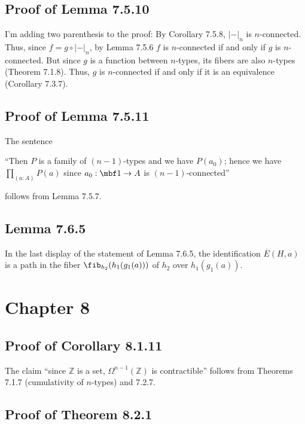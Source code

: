\documentclass[12pt]{article}
\begin{document}

\subsection{Proof of Lemma 7.5.10}

I'm adding two parenthesis to the proof: By Corollary 7.5.8, $|-|_n$ is $n$-connected. Thus, since $f=g\circ |-|_n$, by Lemma 7.5.6 $f$ is $n$-connected if and only if $g$ is $n$-connected. But since $g$ is a function between $n$-types, its fibers are also $n$-types (Theorem 7.1.8). Thus, $g$ is $n$-connected if and only if it is an equivalence (Corollary 7.3.7).


\subsection{Proof of Lemma 7.5.11}

The sentence 

\nn``Then $P$ is a family of $(n-1)$-types and we have $P(a_0)$; hence we have $\prod_{(a:A)}P(a)$ since $a_0:\mbf1\to A$ is $(n-1)$-connected''

\nn follows from Lemma 7.5.7.


\subsection{Lemma 7.6.5}

In the last display of the statement of Lemma 7.6.5, the identification $\overline{E}(H,a)$ is a path in the fiber $\fib_{h_2}(h_1(g_1(a)))$ of $h_2$ over $h_1(g_1(a))$.


\section{Chapter 8}

\subsection{Proof of Corollary 8.1.11}

The claim ``since $\mathbb Z$ is a set, $\Omega^{n-1}(\mathbb Z)$ is contractible'' follows from Theorems 7.1.7 (cumulativity of $n$-types) and 7.2.7.


\subsection{Proof of Theorem 8.2.1}
\end{document}
